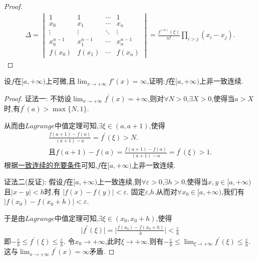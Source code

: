 \documentclass[lang=cn,newtx,10pt,scheme=chinese]{elegantbook}
\begin{document}
\begin{proof}
    \begin{align}
        \Delta = 
    \begin{vmatrix}
    1 & 1 & \cdots & 1 \\
    x_0 & x_1 & \cdots & x_n \\
    \vdots & \vdots & \ddots & \vdots \\
    x_0^{n-1} & x_1^{n-1} & \cdots & x_n^{n-1} \\
    f(x_0) & f(x_1) & \cdots & f(x_n)
    \end{vmatrix}
    = \frac{f^{(n)}(\xi)}{n!} \prod_{i > j} (x_i - x_j).
        \nonumber
    \end{align}
\end{proof}

\begin{exercise}
    设\(f\)在\([a, +\infty)\)上可微,且\(\lim_{x \to +\infty} f'(x) = \infty\),证明:\(f\)在\([a, +\infty)\)上非一致连续.
\end{exercise}
\begin{proof}
    {\color{blue}证法一:}
    不妨设\(\lim_{x\rightarrow +\infty} f^{\prime}(x)=+\infty\),则对\(\forall N > 0\),\(\exists X > 0\),使得当\(a > X\)时,有\(f^{\prime}(a) > \max\{N, 1\}\).

从而由\(Lagrange\)中值定理可知,\(\exists \xi \in (a, a + 1)\),使得
\begin{gather*}
   \frac{f(a + 1) - f(a)}{(a + 1) - a}=f^{\prime}(\xi) > N.
   \\
   \text{且}f(a + 1) - f(a)=\frac{f(a + 1) - f(a)}{(a + 1) - a}=f^{\prime}(\xi) > 1.
\end{gather*}
    根据\hyperref[pro:一致连续的充要条件1]{一致连续的充要条件}可知,\(f\)在\([a, +\infty)\)上非一致连续.

    {\color{blue}证法二(反证):}
    假设\(f\)在\([a, +\infty)\)上一致连续,则\(\forall \varepsilon > 0\),\(\exists h > 0\),使得当\(x,y\in [a, +\infty)\)且\(\vert x - y\vert < h\)时,有
    \(\vert f(x) - f(y)\vert < \varepsilon\).
固定\(\varepsilon\),\(h\).从而对\(\forall x_0\in [a, +\infty)\),我们有\(\vert f(x_0) - f(x_0 + h)\vert < \varepsilon\).

于是由\(Lagrange\)中值定理可知,\(\exists \xi \in (x_0, x_0 + h)\),使得
\begin{align*}
    \vert f^{\prime}(\xi)\vert=\vert\frac{f(x_0) - f(x_0 + h)}{h}\vert < \frac{\varepsilon}{h}
\end{align*}
即\(-\frac{\varepsilon}{h}\leqslant f^{\prime}(\xi) \leqslant \frac{\varepsilon}{h}\).
令\(x_0\rightarrow +\infty\),此时\(\xi \rightarrow +\infty\).则有\(-\frac{\varepsilon}{h}\leqslant \lim_{\xi \rightarrow +\infty}f^{\prime}(\xi) \leqslant \frac{\varepsilon}{h}\).这与\(\lim_{x\rightarrow +\infty}f^{\prime}(x) =\infty\)矛盾.
\end{proof}
\end{document}
